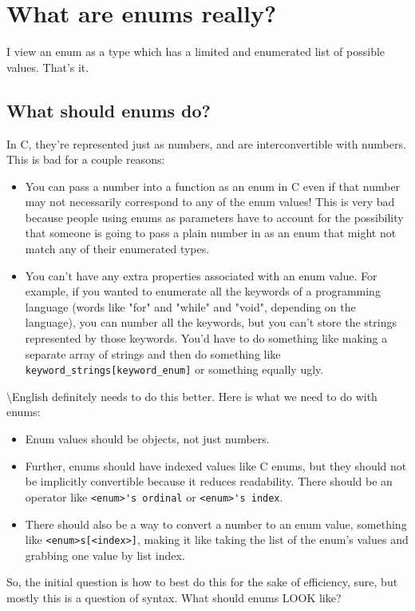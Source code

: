 \documentclass{article}
\newcommand{\name}{\textbackslash{}English}
\begin{document}
\section{What are enums really?}
\indent I view an enum as a type which has a limited and enumerated list of possible values. That's it.\\
\subsection{What should enums do?}
\indent In C, they're represented just as numbers, and are interconvertible with numbers. This is bad for a couple reasons:
\begin{itemize}
	\item You can pass a number into a function as an enum in C even if that number may not necessarily correspond to any of the enum values! This is very bad because people using enums as parameters have to account for the possibility that someone is going to pass a plain number in as an enum that might not match any of their enumerated types.
	\item You can't have any extra properties associated with an enum value. For example, if you wanted to enumerate all the keywords of a programming language (words like "for" and "while" and "void", depending on the language), you can number all the keywords, but you can't store the strings represented by those keywords. You'd have to do something like making a separate array of strings and then do something like \verb!keyword_strings[keyword_enum]! or something equally ugly.
\end{itemize}
\indent \name{} definitely needs to do this better. Here is what we need to do with enums:
\begin{itemize}
	\item Enum values should be objects, not just numbers.
	\item Further, enums should have indexed values like C enums, but they should not be implicitly convertible because it reduces readability. There should be an operator like \verb!<enum>'s ordinal! or \verb!<enum>'s index!.
	\item There should also be a way to convert a number to an enum value, something like \verb!<enum>s[<index>]!, making it like taking the list of the enum's values and grabbing one value by list index.
\end{itemize}
\indent So, the initial question is how to best do this for the sake of efficiency, sure, but mostly this is a question of syntax. What should enums LOOK like?\\
\end{document}
